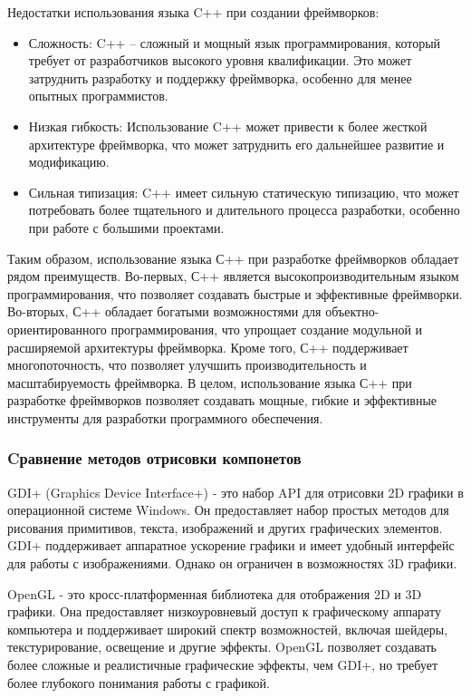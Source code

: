 Недостатки использования языка C++ при создании фреймворков:
\begin{itemize}
\item Сложность: C++ – сложный и мощный язык программирования, который требует от разработчиков высокого уровня квалификации. Это может затруднить разработку и поддержку фреймворка, особенно для менее опытных программистов.
\item Низкая гибкость: Использование C++ может привести к более жесткой архитектуре фреймворка, что может затруднить его дальнейшее развитие и модификацию.
\item Сильная типизация: C++ имеет сильную статическую типизацию, что может потребовать более тщательного и длительного процесса разработки, особенно при работе с большими проектами.
\end{itemize}

Таким образом, использование языка С++ при разработке фреймворков обладает рядом преимуществ. Во-первых, С++ является высокопроизводительным языком программирования, что позволяет создавать быстрые и эффективные фреймворки. Во-вторых, С++ обладает богатыми возможностями для объектно-ориентированного программирования, что упрощает создание модульной и расширяемой архитектуры фреймворка. Кроме того, С++ поддерживает многопоточность, что позволяет улучшить производительность и масштабируемость фреймворка. В целом, использование языка С++ при разработке фреймворков позволяет создавать мощные, гибкие и эффективные инструменты для разработки программного обеспечения.

\subsubsection{Cравнение методов отрисовки компонетов}

GDI+ (Graphics Device Interface+) - это набор API для отрисовки 2D графики в операционной системе Windows. Он предоставляет набор простых методов для рисования примитивов, текста, изображений и других графических элементов. GDI+ поддерживает аппаратное ускорение графики и имеет удобный интерфейс для работы с изображениями. Однако он ограничен в возможностях 3D графики.

OpenGL\cite{gl} - это кросс-платформенная библиотека для отображения 2D и 3D графики. Она предоставляет низкоуровневый доступ к графическому аппарату компьютера и поддерживает широкий спектр возможностей, включая шейдеры, текстурирование, освещение и другие эффекты. OpenGL позволяет создавать более сложные и реалистичные графические эффекты, чем GDI+, но требует более глубокого понимания работы с графикой.

